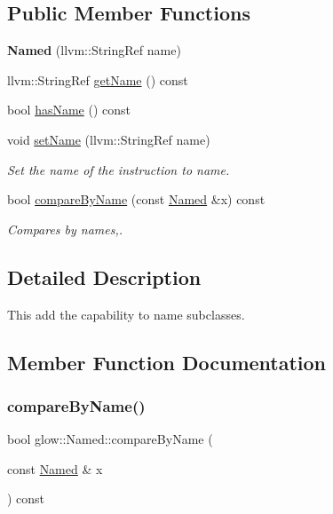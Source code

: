 \subsection*{Public Member Functions}
\begin{DoxyCompactItemize}
\item 
\mbox{\label{classglow_1_1_named_ac406265dc7c227a235ef0967c1ca3b78}} 
{\bfseries Named} (llvm\+::\+String\+Ref name)
\item 
llvm\+::\+String\+Ref \hyperlink{classglow_1_1_named_a953e8bbe0c565edf52e374d461579c4e}{get\+Name} () const
\item 
bool \hyperlink{classglow_1_1_named_aafdd13e8cd2d61adbbc9cb6fedd0acd4}{has\+Name} () const
\item 
\mbox{\label{classglow_1_1_named_ac99fea3a80a29c8177bbba36232ba850}} 
void \hyperlink{classglow_1_1_named_ac99fea3a80a29c8177bbba36232ba850}{set\+Name} (llvm\+::\+String\+Ref name)
\begin{DoxyCompactList}\small\item\em Set the name of the instruction to {\ttfamily name}. \end{DoxyCompactList}\item 
bool \hyperlink{classglow_1_1_named_a199b7443a774b5268848a783ef6cb186}{compare\+By\+Name} (const \hyperlink{classglow_1_1_named}{Named} \&x) const
\begin{DoxyCompactList}\small\item\em Compares by names,. \end{DoxyCompactList}\end{DoxyCompactItemize}


\subsection{Detailed Description}
This add the capability to name subclasses. 

\subsection{Member Function Documentation}
\mbox{\label{classglow_1_1_named_a199b7443a774b5268848a783ef6cb186}} 
\subsubsection{\texorpdfstring{compare\+By\+Name()}{compareByName()}}
{\footnotesize\ttfamily bool glow\+::\+Named\+::compare\+By\+Name (\begin{DoxyParamCaption}\item[{const \hyperlink{classglow_1_1_named}{Named} \&}]{x }\end{DoxyParamCaption}) const\hspace{0.3cm}{\ttfamily [inline]}}



